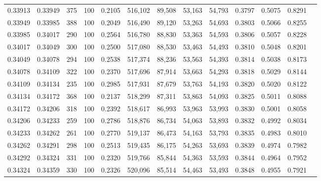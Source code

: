 \begin{tabular}{rrrrrrrrrrrrr}
0.33913 & 0.33949 &   375 & 100 &                                     0.2105 & 516,102 &  89,508 &  53,163 &  54,793 & 0.3797 & 0.5075 & 0.8291 \\
0.33949 & 0.33985 &   388 & 100 &                                     0.2049 & 516,490 &  89,120 &  53,263 &  54,693 & 0.3803 & 0.5066 & 0.8255 \\
0.33985 & 0.34017 &   290 & 100 &                                     0.2564 & 516,780 &  88,830 &  53,363 &  54,593 & 0.3806 & 0.5057 & 0.8228 \\
0.34017 & 0.34049 &   300 & 100 &                                     0.2500 & 517,080 &  88,530 &  53,463 &  54,493 & 0.3810 & 0.5048 & 0.8201 \\
0.34049 & 0.34078 &   294 & 100 &                                     0.2538 & 517,374 &  88,236 &  53,563 &  54,393 & 0.3814 & 0.5038 & 0.8173 \\
0.34078 & 0.34109 &   322 & 100 &                                     0.2370 & 517,696 &  87,914 &  53,663 &  54,293 & 0.3818 & 0.5029 & 0.8144 \\
0.34109 & 0.34134 &   235 & 100 &                                     0.2985 & 517,931 &  87,679 &  53,763 &  54,193 & 0.3820 & 0.5020 & 0.8122 \\
0.34134 & 0.34172 &   368 & 100 &                                     0.2137 & 518,299 &  87,311 &  53,863 &  54,093 & 0.3825 & 0.5011 & 0.8088 \\
0.34172 & 0.34206 &   318 & 100 &                                     0.2392 & 518,617 &  86,993 &  53,963 &  53,993 & 0.3830 & 0.5001 & 0.8058 \\
0.34206 & 0.34233 &   259 & 100 &                                     0.2786 & 518,876 &  86,734 &  54,063 &  53,893 & 0.3832 & 0.4992 & 0.8034 \\
0.34233 & 0.34262 &   261 & 100 &                                     0.2770 & 519,137 &  86,473 &  54,163 &  53,793 & 0.3835 & 0.4983 & 0.8010 \\
0.34262 & 0.34291 &   298 & 100 &                                     0.2513 & 519,435 &  86,175 &  54,263 &  53,693 & 0.3839 & 0.4974 & 0.7982 \\
0.34292 & 0.34324 &   331 & 100 &                                     0.2320 & 519,766 &  85,844 &  54,363 &  53,593 & 0.3844 & 0.4964 & 0.7952 \\
0.34324 & 0.34359 &   330 & 100 &                                     0.2326 & 520,096 &  85,514 &  54,463 &  53,493 & 0.3848 & 0.4955 & 0.7921 \\

\end{tabular}
